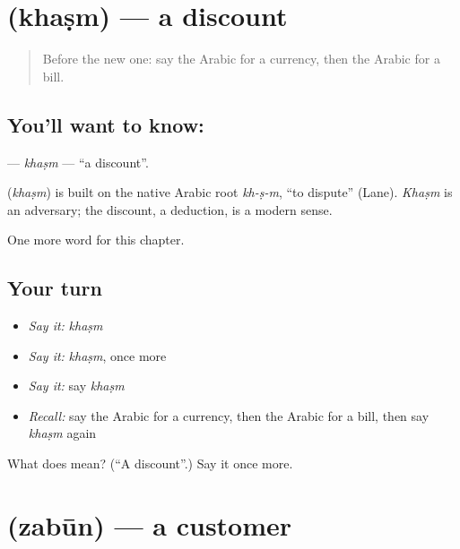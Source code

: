 \section[\texorpdfstring{\ar{خصم} (khaṣm)}{خصم (khaṣm)}]{ (khaṣm) — a discount}

\label{lesson:AR-C188-khasm}



\begin{quote}
Before the new one: say the Arabic for a currency, then the Arabic for a bill.
\end{quote}

\subsection*{You'll want to know: }
\textbf{} — \emph{khaṣm} — \textquotedblleft{}a discount\textquotedblright{}.

\begin{cousinweb}
\textbf{} (\emph{khaṣm}) is built on the native Arabic root \emph{kh-ṣ-m}, \textquotedblleft{}to dispute\textquotedblright{} (Lane). \emph{Khaṣm} is an adversary; the discount, a deduction, is a modern sense.
\end{cousinweb}

\begin{grammarlens}[title={What you've built}]
One more word for this chapter.
\end{grammarlens}

\subsection*{Your turn}
\begin{itemize}
\raggedright
  \item \emph{Say it:} \emph{khaṣm}
  \item \emph{Say it:} \emph{khaṣm}, once more
  \item \emph{Say it:} say \emph{khaṣm}
  \item \emph{Recall:} say the Arabic for a currency, then the Arabic for a bill, then say \emph{khaṣm} again
\end{itemize}

\begin{tcolorbox}[breakable,colback=teal!4,colframe=teal!35!black,title={Before you move on}]
What does  mean? (\textquotedblleft{}A discount\textquotedblright{}.) Say it once more.
\end{tcolorbox}
\section[\texorpdfstring{\ar{زبون} (zabūn)}{زبون (zabūn)}]{ (zabūn) — a customer}

